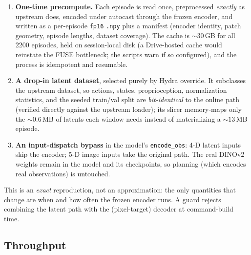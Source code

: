 \documentclass[11pt,a4paper]{article}
\begin{document}
\begin{enumerate}[leftmargin=1.4em]
  \item \textbf{One-time precompute.} Each episode is read once, preprocessed
        \emph{exactly} as upstream does, encoded under autocast through the
        frozen encoder, and written as a per-episode \texttt{fp16} \texttt{.npy}
        plus a manifest (encoder identity, patch geometry, episode lengths,
        dataset coverage). The cache is ${\sim}30$\,GB for all 2200 episodes,
        held on session-local disk (a Drive-hosted cache would reinstate the
        FUSE bottleneck; the scripts warn if so configured), and the process
        is idempotent and resumable.
  \item \textbf{A drop-in latent dataset}, selected purely by Hydra override.
        It subclasses the upstream dataset, so actions, states,
        proprioception, normalization statistics, and the seeded train/val
        split are \emph{bit-identical} to the online path (verified directly
        against the upstream loader); its slicer memory-maps only the
        ${\sim}0.6$\,MB of latents each window needs instead of materializing a
        ${\sim}13$\,MB episode.
  \item \textbf{An input-dispatch bypass} in the model's \texttt{encode\_obs}:
        4-D latent inputs skip the encoder; 5-D image inputs take the original
        path. The real DINOv2 weights remain in the model and its checkpoints,
        so planning (which encodes real observations) is untouched.
\end{enumerate}

This is an \emph{exact} reproduction, not an approximation: the only quantities
that change are when and how often the frozen encoder runs. A guard rejects
combining the latent path with the (pixel-target) decoder at command-build
time.

\subsection{Throughput}
\end{document}
